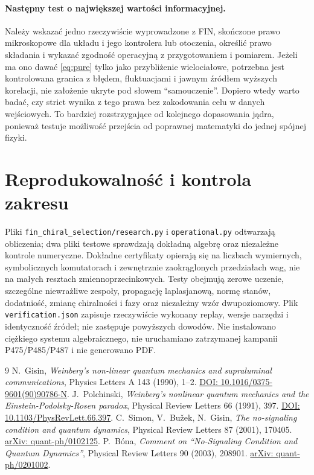 \documentclass[11pt,a4paper]{article}
\begin{document}
\paragraph{Następny test o największej wartości informacyjnej.}
Należy wskazać jedno rzeczywiście wyprowadzone z FIN, skończone prawo
mikroskopowe dla układu i jego kontrolera lub otoczenia, określić prawo
składania i wykazać zgodność operacyjną z przygotowaniem i pomiarem.
Jeżeli ma ono dawać \eqref{eq:pure} tylko jako przybliżenie wielociałowe,
potrzebna jest kontrolowana granica z błędem, fluktuacjami i jawnym
źródłem wyższych korelacji, nie założenie ukryte pod słowem
``samouczenie''. Dopiero wtedy warto badać, czy strict wynika z tego
prawa bez zakodowania celu w danych wejściowych. To bardziej
rozstrzygające od kolejnego dopasowania jądra, ponieważ testuje możliwość
przejścia od poprawnej matematyki do jednej spójnej fizyki.

\section*{Reprodukowalność i kontrola zakresu}

Pliki \texttt{fin\_chiral\_selection/research.py} i
\texttt{operational.py} odtwarzają obliczenia; dwa pliki testowe
sprawdzają dokładną algebrę oraz niezależne kontrole numeryczne.
Dokładne certyfikaty opierają się na liczbach wymiernych, symbolicznych
komutatorach i zewnętrznie zaokrąglonych przedziałach wag, nie na
małych resztach zmiennoprzecinkowych. Testy obejmują zerowe uczenie,
szczególne niewrażliwe zespoły, propagację laplasjanową, normę stanów,
dodatniość, zmianę chiralności i fazy oraz niezależny wzór dwupoziomowy.
Plik \texttt{verification.json} zapisuje rzeczywiście wykonany replay,
wersje narzędzi i identyczność źródeł; nie zastępuje powyższych dowodów.
Nie instalowano ciężkiego systemu algebraicznego, nie uruchamiano
zatrzymanej kampanii P475/P485/P487 i nie generowano PDF.

\begin{thebibliography}{9}
N.~Gisin, \emph{Weinberg's non-linear quantum mechanics and supraluminal
communications}, Physics Letters A 143 (1990), 1--2.
\href{https://doi.org/10.1016/0375-9601(90)90786-N}{DOI: 10.1016/0375-9601(90)90786-N}.
J.~Polchinski, \emph{Weinberg's nonlinear quantum mechanics and the
Einstein-Podolsky-Rosen paradox}, Physical Review Letters 66 (1991), 397.
\href{https://doi.org/10.1103/PhysRevLett.66.397}{DOI: 10.1103/PhysRevLett.66.397}.
C.~Simon, V.~Bužek, N.~Gisin, \emph{The no-signaling condition and quantum
dynamics}, Physical Review Letters 87 (2001), 170405.
\href{https://arxiv.org/abs/quant-ph/0102125}{arXiv: quant-ph/0102125}.
P.~Bóna, \emph{Comment on ``No-Signaling Condition and Quantum Dynamics''},
Physical Review Letters 90 (2003), 208901.
\href{https://arxiv.org/abs/quant-ph/0201002}{arXiv: quant-ph/0201002}.
\end{thebibliography}
\end{document}
